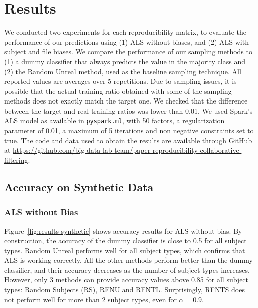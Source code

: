 \documentclass[10pt, conference, compsocconf]{IEEEtran}
\begin{document}
\section{Results}
\label{sec:results}
We conducted two experiments for each reproducibility matrix, to evaluate the performance of our 
predictions using (1) ALS without biases, and (2) ALS with subject and file biases. We 
compare the performance of our sampling methods to (1) a dummy 
classifier that always predicts the value in the majority class and (2) 
the Random Unreal method, used as the baseline sampling technique. All 
reported values are averages over 5 repetitions. Due to sampling 
issues, it is possible that the actual training ratio obtained with 
some of the sampling methods does not exactly
match the target one. We checked that the difference between the target 
and real training ratios was lower than 0.01. We used Spark's ALS model 
as available in \texttt{pyspark.ml}, with 50 factors, a 
regularization parameter of 0.01, a maximum of 5 iterations and non 
negative constraints set to true. The code and data used to obtain the results are available through GitHub at
\url{https://github.com/big-data-lab-team/paper-reproducibility-collaborative-filtering}.


\subsection{Accuracy on Synthetic Data}

\subsubsection{ALS without Bias}
 Figure~\ref{fig:results-synthetic} shows accuracy results for ALS 
 without bias. By construction, the accuracy of the dummy classifier is 
 close to 0.5 for all subject types. Random Unreal performs well 
 for all subject types, which confirms that ALS is working correctly. 
 All the other methods 
perform better than the dummy classifier, and their accuracy decreases 
as the number of subject types increases.
However, only 3 methods can provide accuracy values above 0.85 
for all subject types: Random Subjects (RS), RFNU and RFNTL. 
Surprisingly, RFNTS does not perform well for more than 2 subject 
types, even for $\alpha=0.9$.
\end{document}
